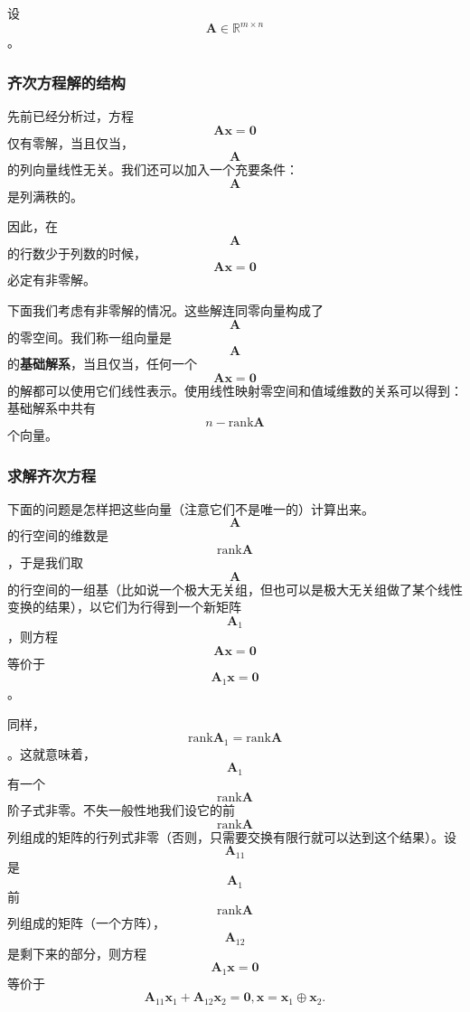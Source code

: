 设$$\boldsymbol{A} \in \mathbb{R}^{m \times n}$$。

\hypertarget{ux9f50ux6b21ux65b9ux7a0bux89e3ux7684ux7ed3ux6784}{%
\subsubsection{齐次方程解的结构}\label{ux9f50ux6b21ux65b9ux7a0bux89e3ux7684ux7ed3ux6784}}

先前已经分析过，方程$$\boldsymbol{A} \boldsymbol{x} = \boldsymbol{0}$$仅有零解，当且仅当，$$\boldsymbol{A}$$的列向量线性无关。我们还可以加入一个充要条件：$$\boldsymbol{A}$$是列满秩的。

因此，在$$\boldsymbol{A}$$的行数少于列数的时候，$$\boldsymbol{A} \boldsymbol{x} = \boldsymbol{0}$$必定有非零解。

下面我们考虑有非零解的情况。这些解连同零向量构成了$$\boldsymbol{A}$$的零空间。我们称一组向量是$$\boldsymbol{A}$$的\textbf{基础解系}，当且仅当，任何一个$$\boldsymbol{A} \boldsymbol{x} = \boldsymbol{0}$$的解都可以使用它们线性表示。使用线性映射零空间和值域维数的关系可以得到：基础解系中共有$$n-\mathrm{rank}\boldsymbol{A}$$个向量。

\hypertarget{ux6c42ux89e3ux9f50ux6b21ux65b9ux7a0b}{%
\subsubsection{求解齐次方程}\label{ux6c42ux89e3ux9f50ux6b21ux65b9ux7a0b}}

下面的问题是怎样把这些向量（注意它们不是唯一的）计算出来。$$\boldsymbol{A}$$的行空间的维数是$$\mathrm{rank}\boldsymbol{A}$$，于是我们取$$\boldsymbol{A}$$的行空间的一组基（比如说一个极大无关组，但也可以是极大无关组做了某个线性变换的结果），以它们为行得到一个新矩阵$$\boldsymbol{A}_1$$，则方程$$\boldsymbol{A} \boldsymbol{x} = \boldsymbol{0}$$等价于$$\boldsymbol{A}_1 \boldsymbol{x} = \boldsymbol{0}$$。

同样，$$\mathrm{rank}\boldsymbol{A}_1=\mathrm{rank}\boldsymbol{A}$$。这就意味着，$$\boldsymbol{A}_1$$有一个$$\mathrm{rank}\boldsymbol{A}$$阶子式非零。不失一般性地我们设它的前$$\mathrm{rank}\boldsymbol{A}$$列组成的矩阵的行列式非零（否则，只需要交换有限行就可以达到这个结果）。设$$\boldsymbol{A}_{11}$$是$$\boldsymbol{A}_1$$前$$\mathrm{rank}\boldsymbol{A}$$列组成的矩阵（一个方阵），$$\boldsymbol{A}_{12}$$是剩下来的部分，则方程$$\boldsymbol{A}_1 \boldsymbol{x} = \boldsymbol{0}$$等价于
\[
\boldsymbol{A}_{11} \boldsymbol{x}_1 + \boldsymbol{A}_{12} \boldsymbol{x}_2 = \boldsymbol{0}, \boldsymbol{x} = \boldsymbol{x}_1 \oplus \boldsymbol{x}_2.
\]

